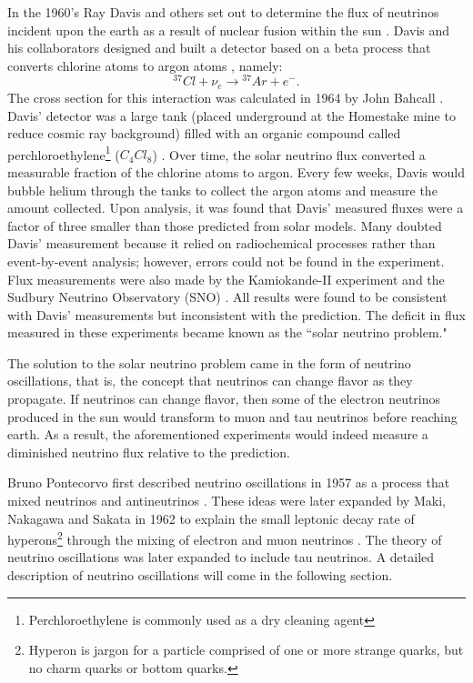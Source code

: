 In the 1960's Ray Davis and others set out to determine the flux of neutrinos
incident upon the earth as a result of nuclear fusion within the sun
\cite{davis}.  Davis
and his collaborators designed and built a detector based on a beta process
that converts chlorine atoms to argon atoms , namely:
\begin{equation}\label{nuChlorCap}
{}^{37}Cl + \nu_e  \rightarrow {}^{37}Ar + e^-.
\end{equation}
The cross section for this interaction was calculated in 1964 by John Bahcall
\cite{bahcall}.  Davis' detector was a large tank (placed underground at the
Homestake mine to reduce cosmic ray background) filled with an organic compound
called perchloroethylene\footnote{Perchloroethylene is commonly used as
a dry cleaning agent} ($C_4Cl_8$)  \cite{davis}.
Over time, the solar
neutrino flux converted a measurable fraction of the chlorine atoms to argon.
Every few weeks, Davis would bubble helium through the tanks to collect the
argon atoms and measure the amount collected.  Upon analysis, it was found that
Davis' measured fluxes were a factor of three smaller than those predicted from
solar models.  Many doubted Davis' measurement because it relied on
radiochemical processes rather than event-by-event analysis; however, errors
could not be found in the experiment.  Flux measurements were also made by the
Kamiokande-II experiment and the Sudbury Neutrino Observatory (SNO)
\cite{kamiokande, sno}.
All results were found to be consistent with Davis' measurements but
inconsistent with the prediction.  The deficit in flux measured in these
experiments became known as the ``solar neutrino problem."


The solution to the solar neutrino problem came in the form of neutrino
oscillations, that is, the concept that neutrinos can change flavor as they
propagate.  If neutrinos can change flavor, then some of the electron neutrinos
produced in the sun would transform to muon and tau neutrinos before reaching
earth.  As a result, the aforementioned experiments would indeed measure a
diminished neutrino flux relative to the prediction.

Bruno Pontecorvo first described neutrino oscillations in 1957 as a process
that mixed neutrinos and antineutrinos  \cite{pontecorvo}.  These ideas were
later expanded by Maki, Nakagawa and Sakata in 1962 to explain the small
leptonic decay rate of hyperons\footnote{Hyperon is jargon for a particle
comprised of
one or more strange quarks, but no charm quarks or bottom quarks.} through the
mixing of electron and muon neutrinos \cite{maki1962remarks}.  The theory of
neutrino oscillations was
later expanded to include tau neutrinos.  A detailed description of neutrino
oscillations will come in the following section.


